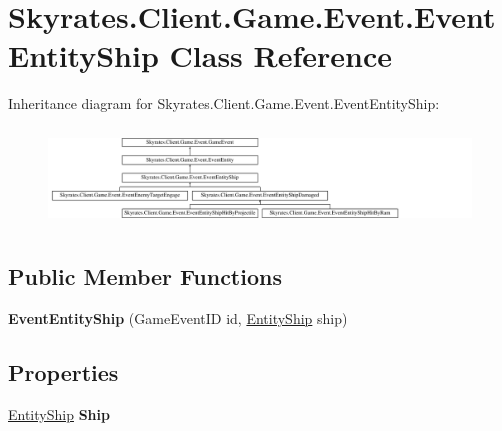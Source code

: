 \hypertarget{class_skyrates_1_1_client_1_1_game_1_1_event_1_1_event_entity_ship}{\section{Skyrates.\-Client.\-Game.\-Event.\-Event\-Entity\-Ship Class Reference}
\label{class_skyrates_1_1_client_1_1_game_1_1_event_1_1_event_entity_ship}
}
Inheritance diagram for Skyrates.\-Client.\-Game.\-Event.\-Event\-Entity\-Ship\-:\begin{figure}[H]
\begin{center}
\leavevmode
\includegraphics[height=2.651515cm]{class_skyrates_1_1_client_1_1_game_1_1_event_1_1_event_entity_ship}
\end{center}
\end{figure}
\subsection*{Public Member Functions}
\begin{DoxyCompactItemize}
\item 
\hypertarget{class_skyrates_1_1_client_1_1_game_1_1_event_1_1_event_entity_ship_a21ae1f26af04bed9f7fff19e1d997ec3}{{\bfseries Event\-Entity\-Ship} (Game\-Event\-I\-D id, \hyperlink{class_skyrates_1_1_client_1_1_entity_1_1_entity_ship}{Entity\-Ship} ship)}\label{class_skyrates_1_1_client_1_1_game_1_1_event_1_1_event_entity_ship_a21ae1f26af04bed9f7fff19e1d997ec3}

\end{DoxyCompactItemize}
\subsection*{Properties}
\begin{DoxyCompactItemize}
\item 
\hypertarget{class_skyrates_1_1_client_1_1_game_1_1_event_1_1_event_entity_ship_aaac97a0d035d3163af76aa5f67bc9c5c}{\hyperlink{class_skyrates_1_1_client_1_1_entity_1_1_entity_ship}{Entity\-Ship} {\bfseries Ship}}\label{class_skyrates_1_1_client_1_1_game_1_1_event_1_1_event_entity_ship_aaac97a0d035d3163af76aa5f67bc9c5c}

\end{DoxyCompactItemize}

